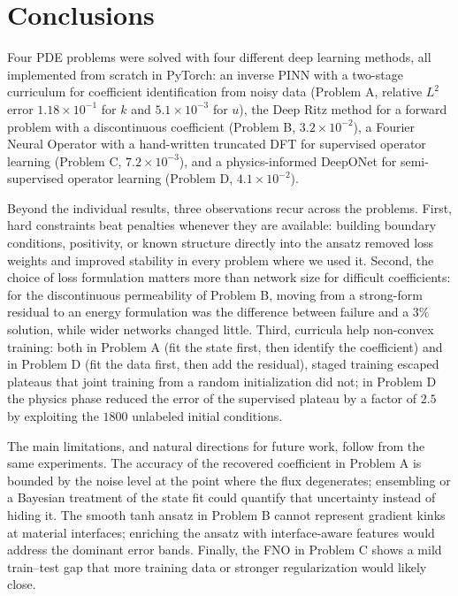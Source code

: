 \chapter{Conclusions}
\label{ch:con}
%
Four PDE problems were solved with four different deep learning methods,
all implemented from scratch in PyTorch: an inverse PINN with a two-stage
curriculum for coefficient identification from noisy data (Problem A,
relative $L^2$ error $1.18\times10^{-1}$ for $k$ and $5.1\times10^{-3}$ for
$u$), the Deep Ritz method for a forward problem with a discontinuous
coefficient (Problem B, $3.2\times10^{-2}$), a Fourier Neural Operator with
a hand-written truncated DFT for supervised operator learning (Problem C,
$7.2\times10^{-3}$), and a physics-informed DeepONet for semi-supervised
operator learning (Problem D, $4.1\times10^{-2}$).

Beyond the individual results, three observations recur across the
problems. First, hard constraints beat penalties whenever they are
available: building boundary conditions, positivity, or known structure
directly into the ansatz removed loss weights and improved stability in
every problem where we used it. Second, the choice of loss formulation
matters more than network size for difficult coefficients: for the
discontinuous permeability of Problem B, moving from a strong-form residual
to an energy formulation was the difference between failure and a $3\%$
solution, while wider networks changed little. Third, curricula help
non-convex training: both in Problem A (fit the state first, then identify
the coefficient) and in Problem D (fit the data first, then add the
residual), staged training escaped plateaus that joint training from a
random initialization did not; in Problem D the physics phase reduced the
error of the supervised plateau by a factor of $2.5$ by exploiting the
$1800$ unlabeled initial conditions.

The main limitations, and natural directions for future work, follow from
the same experiments. The accuracy of the recovered coefficient in Problem
A is bounded by the noise level at the point where the flux degenerates;
ensembling or a Bayesian treatment of the state fit could quantify that
uncertainty instead of hiding it. The smooth tanh ansatz in Problem B
cannot represent gradient kinks at material interfaces; enriching the
ansatz with interface-aware features would address the dominant error
bands. Finally, the FNO in Problem C shows a mild train--test gap that more
training data or stronger regularization would likely close.
